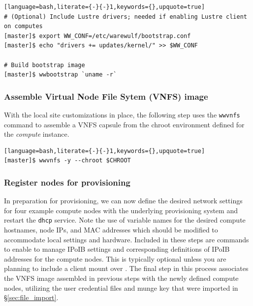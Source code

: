 \documentclass[letterpaper]{article}
\begin{document}
\begin{lstlisting}[language=bash,literate={-}{-}1,keywords={},upquote=true]
# (Optional) Include Lustre drivers; needed if enabling Lustre client on computes
[master]$ export WW_CONF=/etc/warewulf/bootstrap.conf
[master]$ echo "drivers += updates/kernel/" >> $WW_CONF

# Build bootstrap image
[master]$ wwbootstrap `uname -r`
\end{lstlisting}

\subsubsection{Assemble Virtual Node File Sytem (VNFS) image}

With the local site customizations in place, the following step uses the
\texttt{wwvnfs} command to assemble a VNFS capsule from the chroot environment
defined for the {\em compute} instance. 

\begin{lstlisting}[language=bash,literate={-}{-}1,keywords={},upquote=true]
[master]$ wwvnfs -y --chroot $CHROOT
\end{lstlisting}

\subsubsection{Register nodes for provisioning}

In preparation for provisioning, we can now define the desired network settings
for four example compute nodes with the underlying provisioning system and
restart the \texttt{dhcp} service. Note the use of variable names for the
desired compute hostnames, node IPs, and MAC addresses which should be modified to
accommodate local settings and hardware. Included in these steps are commands
to enable \Warewulf{} to manage IPoIB settings and corresponding definitions of
IPoIB addresses for the compute nodes. This is typically optional unless you
are planning to include a \Lustre{} client mount over \InfiniBand{}.  The final step
in this process associates the VNFS image assembled in previous steps with the
newly defined compute nodes, utilizing the user credential files and munge key
that were imported in \S\ref{sec:file_import}.

\end{document}

